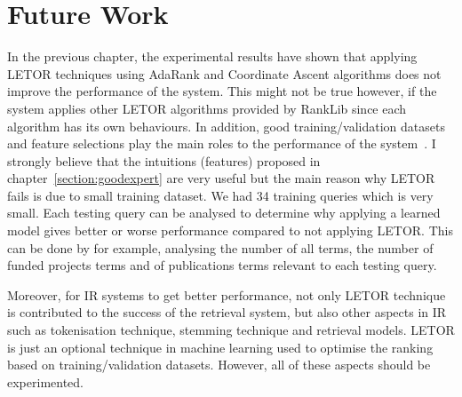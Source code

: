 \section{Future Work}
In the previous chapter, the experimental results have shown that applying LETOR techniques using AdaRank and Coordinate Ascent algorithms 
does not improve the performance
of the system. This might not be true however, if the system applies other LETOR algorithms provided by RankLib since each algorithm has its own behaviours.
In addition, good training/validation datasets and feature selections play the main roles to the performance of the system~\cite{craig}. I strongly believe that the intuitions (features)
proposed in chapter~\ref{section:goodexpert} are very useful but the main reason why LETOR fails is due to small training dataset. 
We had 34 training queries which is very small. Each testing query can be analysed to determine why applying a learned model gives better or worse
performance compared to not applying LETOR. This can be done by for example, analysing the number of all terms,
the number of funded projects terms and of publications terms relevant to each testing query.

Moreover, for IR systems to get better performance, not only LETOR technique is contributed to the success of the retrieval system, but also 
other aspects in IR such as tokenisation technique, stemming technique and retrieval models.
LETOR is just an optional technique in machine learning used to optimise the ranking based 
on training/validation datasets. However, all of these aspects should be experimented.

